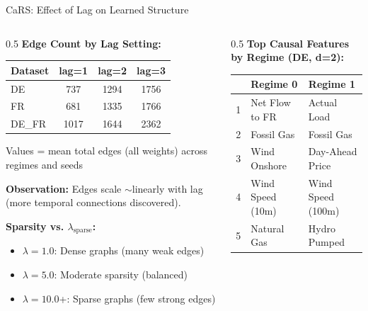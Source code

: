 \documentclass[aspectratio=169]{beamer}
\begin{document}
\begin{frame}{CaRS: Effect of Lag on Learned Structure}
\begin{columns}
\begin{column}{0.5\textwidth}
\textbf{Edge Count by Lag Setting:}
\begin{table}
\scriptsize
\begin{tabular}{l|ccc}
\toprule
\textbf{Dataset} & \textbf{lag=1} & \textbf{lag=2} & \textbf{lag=3} \\
\midrule
DE & 737 & 1294 & 1756 \\
FR & 681 & 1335 & 1766 \\
DE\_FR & 1017 & 1644 & 2362 \\
\bottomrule
\end{tabular}
\end{table}
{\tiny Values = mean total edges (all weights) across regimes and seeds}

\textbf{Observation:} Edges scale $\sim$linearly with lag (more temporal connections discovered).

\vspace{0.3cm}
\textbf{Sparsity vs. $\lambda_{\text{sparse}}$:}
\begin{itemize}
    \item $\lambda=1.0$: Dense graphs (many weak edges)
    \item $\lambda=5.0$: Moderate sparsity (balanced)
    \item $\lambda=10.0$+: Sparse graphs (few strong edges)
\end{itemize}
\end{column}

\begin{column}{0.5\textwidth}
\textbf{Top Causal Features by Regime (DE, d=2):}
\scriptsize
\begin{tabular}{l|ll}
\toprule
& \textbf{Regime 0} & \textbf{Regime 1} \\
\midrule
1 & Net Flow to FR & Actual Load \\
2 & Fossil Gas & Fossil Gas \\
3 & Wind Onshore & Day-Ahead Price \\
4 & Wind Speed (10m) & Wind Speed (100m) \\
5 & Natural Gas & Hydro Pumped \\
\bottomrule
\end{tabular}
\normalsize


\end{column}
\end{columns}
\end{frame}
\end{document}
